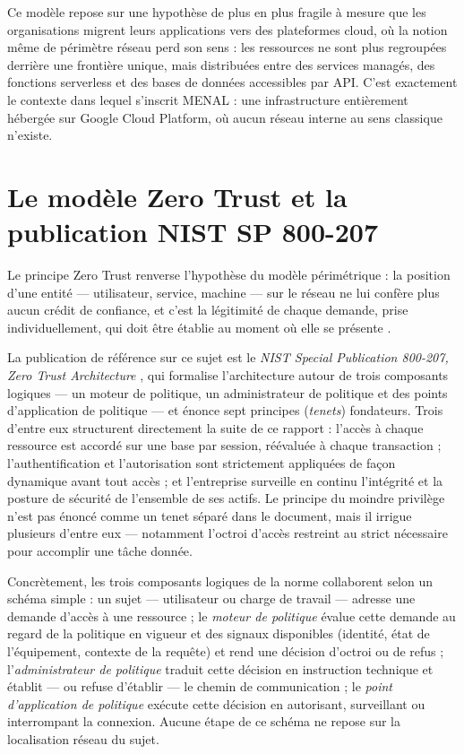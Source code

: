 Ce modèle repose sur une hypothèse de plus en plus fragile à mesure que les organisations
migrent leurs applications vers des plateformes cloud, où la notion même de \og périmètre
réseau \fg{} perd son sens : les ressources ne sont plus regroupées derrière une frontière
unique, mais distribuées entre des services managés, des fonctions serverless et des bases
de données accessibles par API. C'est exactement le contexte dans lequel s'inscrit MENAL :
une infrastructure entièrement hébergée sur Google Cloud Platform, où aucun \og réseau
interne \fg{} au sens classique n'existe.

\section{Le modèle Zero Trust et la publication NIST SP 800-207}
\label{sec:zero-trust-nist}

Le principe Zero Trust renverse l'hypothèse du modèle périmétrique : la position d'une
entité --- utilisateur, service, machine --- sur le réseau ne lui confère plus aucun crédit
de confiance, et c'est la légitimité de chaque demande, prise individuellement, qui doit
être établie au moment où elle se présente \parencite{kindervag2010}.

La publication de référence sur ce sujet est le \emph{NIST Special Publication 800-207,
Zero Trust Architecture} \parencite{nist800207}, qui formalise l'architecture autour de
trois composants logiques --- un moteur de politique, un administrateur de politique et des
points d'application de politique --- et énonce sept principes (\emph{tenets}) fondateurs.
Trois d'entre eux structurent directement la suite de ce rapport : l'accès à chaque ressource
est accordé sur une base par session, réévaluée à chaque transaction ; l'authentification et
l'autorisation sont strictement appliquées de façon dynamique avant tout accès ; et
l'entreprise surveille en continu l'intégrité et la posture de sécurité de l'ensemble de ses
actifs. Le principe du moindre privilège n'est pas énoncé comme un tenet séparé dans le
document, mais il irrigue plusieurs d'entre eux --- notamment l'octroi d'accès restreint au
strict nécessaire pour accomplir une tâche donnée.

Concrètement, les trois composants logiques de la norme collaborent selon un schéma simple :
un sujet --- utilisateur ou charge de travail --- adresse une demande d'accès à une ressource ;
le \emph{moteur de politique} évalue cette demande au regard de la politique en vigueur et des
signaux disponibles (identité, état de l'équipement, contexte de la requête) et rend une
décision d'octroi ou de refus ; l'\emph{administrateur de politique} traduit cette décision en
instruction technique et établit --- ou refuse d'établir --- le chemin de communication ; le
\emph{point d'application de politique} exécute cette décision en autorisant, surveillant ou
interrompant la connexion. Aucune étape de ce schéma ne repose sur la localisation réseau du
sujet.

